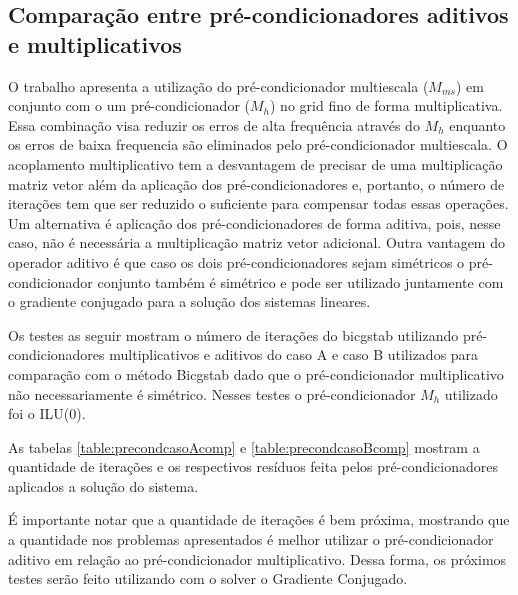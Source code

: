 \subsection{Comparação entre pré-condicionadores aditivos e multiplicativos}
O trabalho \cite{casteletto} apresenta a utilização do pré-condicionador multiescala ($M_{ms}$) em conjunto com o um pré-condicionador ($M_h$) no grid fino de forma multiplicativa. 
Essa combinação visa reduzir os erros de alta frequência através do $M_h$ enquanto os erros de baixa frequencia são eliminados pelo pré-condicionador multiescala. 
O acoplamento multiplicativo tem a desvantagem de precisar de uma multiplicação matriz vetor além da aplicação dos pré-condicionadores
e, portanto, o número de iterações tem que ser reduzido o suficiente para compensar todas essas operações. Um alternativa é aplicação
dos pré-condicionadores de forma aditiva, pois, nesse caso, não é necessária a multiplicação matriz vetor adicional. Outra vantagem do operador
aditivo é que caso os dois pré-condicionadores sejam simétricos o pré-condicionador conjunto também é simétrico e pode ser utilizado juntamente
com o gradiente conjugado para a solução dos sistemas lineares.


Os testes as seguir mostram o número de iterações do bicgstab utilizando pré-condicionadores multiplicativos e aditivos do caso A e caso B utilizados para comparação
com o método Bicgstab dado que o pré-condicionador multiplicativo não necessariamente é simétrico. Nesses testes o pré-condicionador $M_h$ utilizado foi o ILU(0).

As tabelas \ref{table:precondcasoAcomp} e \ref{table:precondcasoBcomp} mostram a quantidade de iterações e os respectivos resíduos feita pelos pré-condicionadores aplicados a solução do sistema. 

É importante notar que a quantidade de iterações é bem próxima, mostrando que a quantidade
nos problemas apresentados é melhor utilizar o pré-condicionador aditivo em relação ao pré-condicionador multiplicativo. Dessa forma, os próximos
testes serão feito utilizando com o solver o Gradiente Conjugado.

